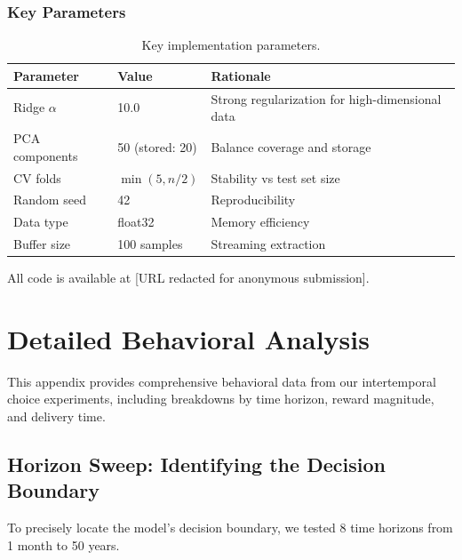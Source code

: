 \documentclass{article}
\begin{document}
\subsubsection{Key Parameters}

\begin{table}[h]
\centering
\small
\begin{tabular}{lll}
\toprule
Parameter & Value & Rationale \\
\midrule
Ridge $\alpha$ & 10.0 & Strong regularization for high-dimensional data \\
PCA components & 50 (stored: 20) & Balance coverage and storage \\
CV folds & $\min(5, n/2)$ & Stability vs test set size \\
Random seed & 42 & Reproducibility \\
Data type & float32 & Memory efficiency \\
Buffer size & 100 samples & Streaming extraction \\
\bottomrule
\end{tabular}
\caption{Key implementation parameters.}
\label{tab:parameters}
\end{table}

All code is available at [URL redacted for anonymous submission].


\section{Detailed Behavioral Analysis}
\label{sec:behavioral_appendix}

This appendix provides comprehensive behavioral data from our intertemporal choice experiments, including breakdowns by time horizon, reward magnitude, and delivery time.

\subsection{Horizon Sweep: Identifying the Decision Boundary}

To precisely locate the model's decision boundary, we tested 8 time horizons from 1 month to 50 years.
\end{document}
